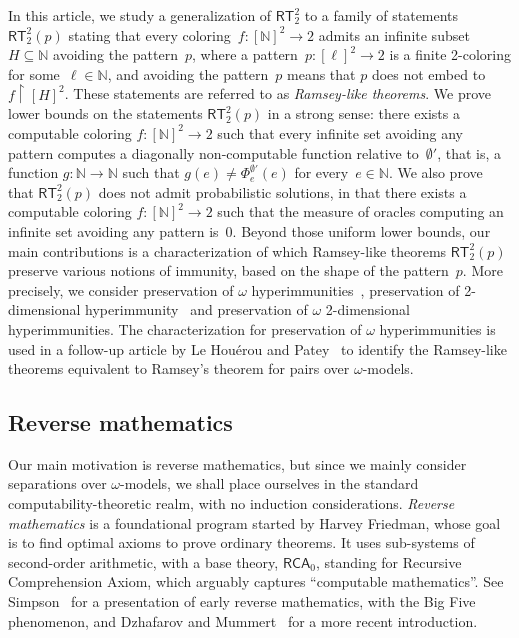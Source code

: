 \documentclass{article}
\newcommand{\uh}{\upharpoonright}
\newcommand{\RCA}[0]{\mathsf{RCA}}
\newcommand{\RT}[0]{\mathsf{RT}}
\newcommand{\NN}[0]{\mathbb{N}}
\def\qt#1{``#1''}%
\def\NN{\mathbb{N}}
\def\qt#1{``#1''}%
\numberwithin{theorem}{section}
\theoremstyle{definition}
\begin{document}
In this article, we study a generalization of $\RT^2_2$ to a family of statements $\RT^2_2(p)$ stating that every coloring~$f : [\NN]^2 \to 2$ admits an infinite subset $H \subseteq \NN$ avoiding the pattern~$p$, where a pattern~$p : [\ell]^2 \to 2$ is a finite 2-coloring for some~$\ell \in \NN$, and avoiding the pattern~$p$ means that $p$ does not embed to $f \uh [H]^2$. These statements are referred to as \emph{Ramsey-like theorems}. We prove lower bounds on the statements $\RT^2_2(p)$ in a strong sense: there exists a computable coloring $f : [\NN]^2 \to 2$ such that every infinite set avoiding any pattern computes a diagonally non-computable function relative to~$\emptyset'$, that is, a function $g : \NN \to \NN$ such that $g(e) \neq \Phi_e^{\emptyset'}(e)$ for every~$e \in \NN$. We also prove that $\RT^2_2(p)$ does not admit probabilistic solutions, in that there exists a computable coloring $f : [\NN]^2 \to 2$ such that the measure of oracles computing an infinite set avoiding any pattern is~0. Beyond those uniform lower bounds, our main contributions is a characterization of which Ramsey-like theorems $\RT^2_2(p)$ preserve various notions of immunity, based on the shape of the pattern~$p$. More precisely, we consider preservation of $\omega$ hyperimmunities~\cite{patey2017iterative,downey2022relationships}, preservation of 2-dimensional hyperimmunity~\cite{liu2022reverse} and preservation of $\omega$ 2-dimensional hyperimmunities. The characterization for preservation of $\omega$ hyperimmunities is used in a follow-up article by Le Houérou and Patey~\cite{houerou2025ramseylike} to identify the Ramsey-like theorems equivalent to Ramsey's theorem for pairs over $\omega$-models.

\subsection{Reverse mathematics}

Our main motivation is reverse mathematics, but since we mainly consider separations over $\omega$-models, we shall place ourselves in the standard computability-theoretic realm, with no induction considerations.
\emph{Reverse mathematics} is a foundational program started by Harvey Friedman, whose goal is to find optimal axioms to prove ordinary theorems. It uses sub-systems of second-order arithmetic, with a base theory, $\RCA_0$, standing for Recursive Comprehension Axiom, which arguably captures \qt{computable mathematics}. See Simpson~\cite{simpson_2009} for a presentation of early reverse mathematics, with the Big Five phenomenon, and Dzhafarov and Mummert~\cite{dzhafarov2022reverse} for a more recent introduction.
\end{document}
